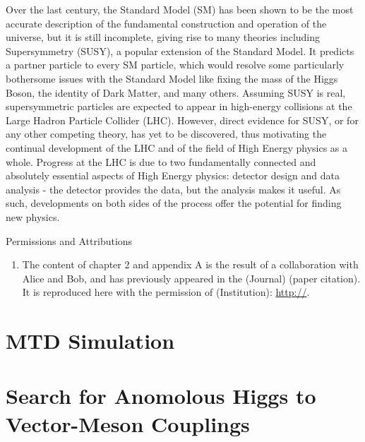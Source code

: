 \documentclass[oneside,12pt,final]{sty/ucthesis-CA2012}
\begin{document}
\begin{mainmatter}
Over the last century, the Standard Model (SM) has been shown to be the most accurate description of the fundamental construction and operation of the universe, but it is still incomplete, giving rise to many theories including Supersymmetry (SUSY), a popular extension of the Standard Model. It predicts a partner particle to every SM particle, which would resolve some particularly bothersome issues with the Standard Model like fixing the mass of the Higgs Boson, the identity of Dark Matter, and many others. Assuming SUSY is real, supersymmetric particles are expected to appear in high-energy collisions at the Large Hadron Particle Collider (LHC). However, direct evidence for SUSY, or for any other competing theory, has yet to be discovered, thus motivating the continual development of the LHC and of the field of High Energy physics as a whole. Progress at the LHC is due to two fundamentally connected and absolutely essential aspects of High Energy physics: detector design and data analysis - the detector provides the data, but the analysis makes it useful. As such, developments on both sides of the process offer the potential for finding new physics.

\begin{section}{Permissions and Attributions}
\begin{enumerate}

\item The content of chapter 2 and appendix A is the result of a collaboration with Alice and Bob, and has previously appeared in the (Journal) (paper citation). It is reproduced here with the permission of (Institution): \url{http://}.

\end{enumerate}
\end{section}

\chapter{MTD Simulation}


\chapter{Search for Anomolous Higgs to Vector-Meson Couplings}


\appendix

\dsp


\end{mainmatter}
\end{document}

